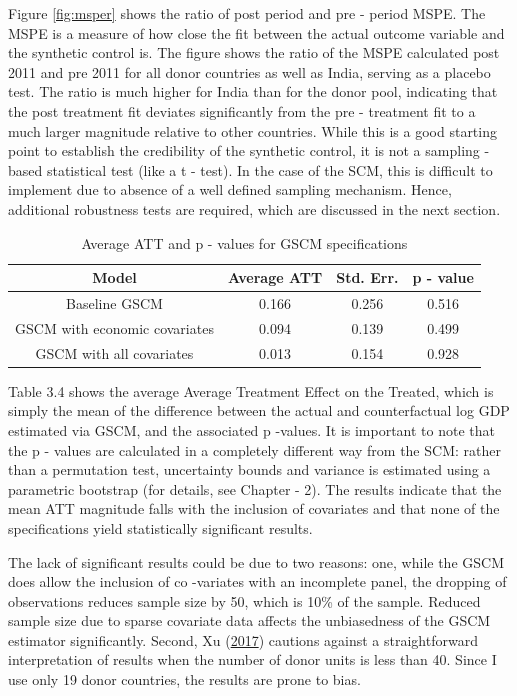 \documentclass[12pt,nobind, a4paper]{reedthesis}
\begin{document}
 Figure \ref{fig:msper} shows the ratio of post period and pre - period MSPE. The MSPE is a measure of how close the fit between the actual outcome variable and the synthetic control is. The figure shows the ratio of the MSPE calculated post 2011 and pre 2011 for all donor countries as well as India, serving as a placebo test. The ratio is much higher for India than for the donor pool, indicating that the post treatment fit deviates significantly from the pre - treatment fit to a much larger magnitude relative to other countries. While this is a good starting point to establish the credibility of the synthetic control, it is not a sampling - based statistical test (like a t - test). In the case of the SCM, this is difficult to implement due to absence of a well defined sampling mechanism. Hence, additional robustness tests are required, which are discussed in the next section.
 \begin{table}[h!!]
 \centering
 \begin{tabular}{cccc}
 \hline
 Model & Average ATT & Std. Err. & p - value\\
 \hline
 Baseline GSCM&0.166& 0.256 & 0.516\\
 \hline
 GSCM with economic covariates & 0.094 & 0.139 & 0.499\\
 \hline
 GSCM with all covariates & 0.013 & 0.154 & 0.928\\
 \hline
 \end{tabular}
 \caption{ Average ATT and p - values for GSCM specifications}
 \end{table}
 Table 3.4 shows the average Average Treatment Effect on the Treated, which is simply the mean of the difference between the actual and counterfactual log GDP estimated via GSCM, and the associated p -values. It is important to note that the p - values are calculated in a completely different way from the SCM: rather than a permutation test, uncertainty bounds and variance is estimated using a parametric bootstrap (for details, see Chapter - 2). The results indicate that the mean ATT magnitude falls with the inclusion of covariates and that none of the specifications yield statistically significant results.
 \linebreak

 The lack of significant results could be due to two reasons: one, while the GSCM does allow the inclusion of co -variates with an incomplete panel, the dropping of observations reduces sample size by 50, which is 10\% of the sample. Reduced sample size due to sparse covariate data affects the unbiasedness of the GSCM estimator significantly. Second, Xu (\protect\hyperlink{ref-xu_generalized_2017}{2017}) cautions against a straightforward interpretation of results when the number of donor units is less than 40. Since I use only 19 donor countries, the results are prone to bias.
\end{document}
